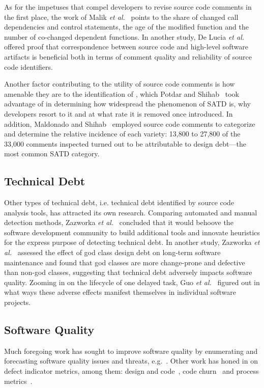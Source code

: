 As for the impetuses that compel developers to revise source code comments in the first place, the work of Malik \textit{et al.}~\cite{malik2008understanding} points to the share of changed call dependencies and control statements, the age of the modified function and the number of co-changed dependent functions. In another study, De Lucia \textit{et al.}~\cite{DeLucia2011} offered proof that correspondence between source code and high-level software artifacts is beneficial both in terms of comment quality and reliability of source code identifiers.

Another factor contributing to the utility of source code comments is how amenable they are to the identification of \SATD, which Potdar and Shihab~\cite{ICSM_PotdarS14} took advantage of in determining how widespread the phenomenon of SATD is, why developers resort to it and at what rate it is removed once introduced. In addition, Maldonado and Shihab~\cite{MTD15p9} employed source code comments to categorize \SATD and determine the relative incidence of each variety: 13,800 to 27,800 of the 33,000 comments inspected turned out to be attributable to design debt---the most common SATD category.

\subsection{Technical Debt}
Other types of technical debt, i.e. technical debt identified by source code analysis tools, has attracted its own research. Comparing automated and manual detection methods, Zazworka \textit{et al.}~\cite{Zazworka:2013} concluded that it would behoove the software development community to build additional tools and innovate heuristics for the express purpose of detecting technical debt. In another study, Zazworka \textit{et al.}~\cite{zazworka2011investigating} assessed the effect of god class design debt on long-term software maintenance and found that god classes are more change-prone and defective than non-god classes, suggesting that technical debt adversely impacts software quality. Zooming in on the lifecycle of one delayed task, Guo \textit{et al.}~\cite{GuoSGCTSSS11} figured out in what ways these adverse effects manifest themselves in individual software projects.

\subsection{Software Quality}
Much foregoing work has sought to improve software quality by enumerating and forecasting software quality issues and threats, e.g.~\cite{Zimmerman2008Springer}. Other work has honed in on defect indicator metrics, among them: design and code~\cite{Jiang-promise-2008}, code churn~\cite{Nagappan-icse-2005} and process metrics~\cite{Moser-icse-2008,Rahman-icse-2013}.

